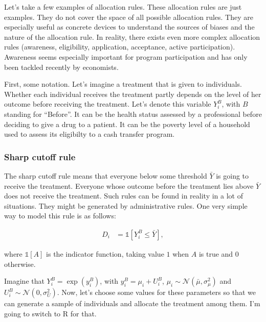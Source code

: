 \documentclass[]{book}
\newcommand{\uns}[1]{\mathds{1}[ #1 ]}
\theoremstyle{definition}
\theoremstyle{definition}
\theoremstyle{definition}
\theoremstyle{remark}
\let\BeginKnitrBlock\begin \let\EndKnitrBlock\end
\begin{document}
Let's take a few examples of allocation rules. These allocation rules
are just examples. They do not cover the space of all possible
allocation rules. They are especially useful as concrete devices to
understand the sources of biases and the nature of the allocation rule.
In reality, there exists even more complex allocation rules (awareness,
eligibility, application, acceptance, active participation). Awareness
seems especially important for program participation and has only been
tackled recently by economists.

First, some notation. Let's imagine a treatment that is given to
individuals. Whether each individual receives the treatment partly
depends on the level of her outcome before receiving the treatment.
Let's denote this variable \(Y^B_i\), with \(B\) standing for
``Before''. It can be the health status assessed by a professional
before deciding to give a drug to a patient. It can be the poverty level
of a household used to assess its eligibilty to a cash transfer program.

\subsubsection{Sharp cutoff rule}\label{sharp-cutoff-rule}

The sharp cutoff rule means that everyone below some threshold
\(\bar{Y}\) is going to receive the treatment. Everyone whose outcome
before the treatment lies above \(\bar{Y}\) does not receive the
treatment. Such rules can be found in reality in a lot of situations.
They might be generated by administrative rules. One very simple way to
model this rule is as follows:

\begin{align}\label{eq:cutoff}
  D_i & = \uns{Y_i^B\leq\bar{Y}},
\end{align}

where \(\uns{A}\) is the indicator function, taking value \(1\) when
\(A\) is true and \(0\) otherwise.

\BeginKnitrBlock{example}[Sharp cutoff rule]
\protect\hypertarget{exm:unnamed-chunk-1}{}{\label{exm:unnamed-chunk-1}
\iffalse (Sharp cutoff rule) \fi{} }Imagine that \(Y_i^B=\exp(y_i^B)\),
with \(y_i^B=\mu_i+U_i^B\),
\(\mu_i\sim\mathcal{N}(\bar{\mu},\sigma^2_{\mu})\) and
\(U_i^B\sim\mathcal{N}(0,\sigma^2_{U})\). Now, let's choose some values
for these parameters so that we can generate a sample of individuals and
allocate the treatment among them. I'm going to switch to R for that.
\EndKnitrBlock{example}
\end{document}
